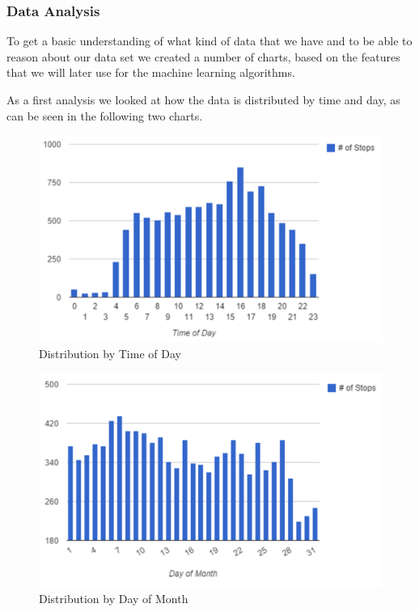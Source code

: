 \subsubsection{Data Analysis}
To get a basic understanding of what kind of data that we have and to be able to reason about our data set we created a number of charts, based on the features that we will later use for the machine learning algorithms. 

As a first analysis we looked at how the data is distributed by time and day, as can be seen in the following two charts.

\begin{figure}[!ht]
	\caption{Distribution by Time of Day}
	\centering
	\includegraphics[width=1.0\textwidth]{charts/distribution_time_of_day}
\end{figure}

\begin{figure}[!ht]
	\caption{Distribution by Day of Month}
	\centering
	\includegraphics[width=1.0\textwidth]{charts/day_of_month_distribution}
\end{figure}

